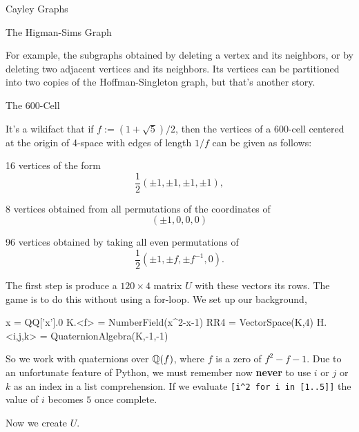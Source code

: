 \begin{chap}{Cayley Graphs}
\begin{sect}{The Higman-Sims Graph}
\begin{para}
For example, the subgraphs obtained by deleting a vertex and its neighbors,
or by deleting two adjacent vertices and its neighbors. Its vertices
can be partitioned into two copies of the Hoffman-Singleton graph,
but that's another story.
\end{para}
%
\end{sect}
%
\begin{sect}{The 600-Cell}
%
\begin{para}
It's a wikifact that if $f:=(1+\sqrt{5})/2$, then the vertices of a 600-cell 
centered at the origin of 4-space with edges of length $1/f$ 
can be given as follows: 
\begin{enumerate}
    \begin{listitem}
    16 vertices of the form
    \[
        \frac12(\pm1,\pm1,\pm1,\pm1),
    \]
    \end{listitem}
    \begin{listitem}
    8 vertices obtained from all permutations of the coordinates of
    \[
        (\pm1,0,0,0)
    \]
    \end{listitem}
    \begin{listitem}
    96 vertices obtained by taking all even permutations of
    \[
        \frac12\left(\pm1,\pm f,\pm f^{-1},0\right).
    \]
    \end{listitem}
\end{enumerate}  
\end{para}
%
\begin{para}
The first step is produce a $120\times4$ matrix $U$ with these vectors
its rows. The game is to do this without using a for-loop.
We set up our background,
\end{para}
%
\begin{sagecode}
\begin{sageinput}
x = QQ['x'].0
K.<f> = NumberField(x^2-x-1)
RR4 = VectorSpace(K,4) 
H.<i,j,k> = QuaternionAlgebra(K,-1,-1)
\end{sageinput}
\end{sagecode}
%
\begin{para}
So we work with quaternions over ${\mathbb Q}(f)$, where $f$ is a zero of $f^2-f-1$.
Due to an unfortunate feature of Python, we must remember now \textbf{never}
to use $i$ or $j$ or $k$ as an index in a list comprehension.  If we evaluate 
\verb|[i^2 for i in [1..5]]| the value of $i$ becomes $5$ once complete.
\end{para}
%
\begin{para}
Now we create $U$. 
\end{para}

\end{sect}
\end{chap}
